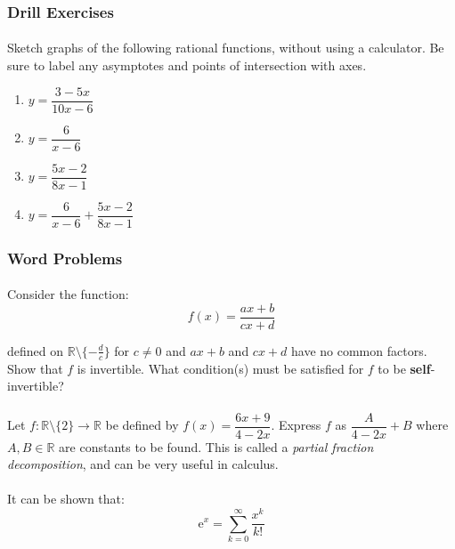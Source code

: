 \documentclass[12pt, a4paper, titlepage, twoside]{article}
\newcommand*{\R}{\mathbb{R}}
\newcommand*{\e}{\textrm{e}}
\begin{document}
	\subsubsection*{Drill Exercises}	
	
	\paragraph{}
	 Sketch graphs of the following rational functions, without using a calculator. Be sure to
	label any asymptotes and points of intersection with axes.
	
	\begin{multicols}{2}
		\begin{enumerate}[label=\textbf{(\alph*)}]
			\item $y = \dfrac{3-5x}{10x-6}$
			\item $y = \dfrac{6}{x-6}$
			\item $y = \dfrac{5x-2}{8x-1}$
			\item $y = \dfrac{6}{x-6} + \dfrac{5x-2}{8x-1}$
		\end{enumerate}
	\end{multicols}
	
	\hfill
	
	\subsubsection*{Word Problems}
	
	\paragraph{}
	Consider the function:
	\[ f(x) = \dfrac{ax+b}{cx+d} \]
	
	defined on $\R \setminus \{-\frac{d}{c}\}$ for $c \neq 0$ and $ax+b$ and $cx+d$ have no common factors. Show that $f$ is invertible. 
	What condition(s) must be satisfied for $f$ to be \textbf{self}-invertible?
	
	\paragraph{}
	Let $f : \R \setminus \{2\} \to \R$ be defined by $f(x) = \dfrac{6x+9}{4-2x}$. Express $f$ as $\dfrac{A}{4-2x} + B$ where
	$A,B \in \R$ are constants to be found. This is called a \textit{partial fraction decomposition}, and can be very useful in calculus.
	
	\paragraph{}
	It can be shown that: 
	\[\e^x = \sum_{k=0}^\infty \dfrac{x^k}{k!} \]
	
\end{document}
